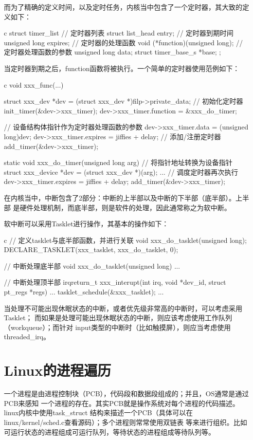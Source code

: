 而为了精确的定义时间，以及定时任务，内核当中包含了一个定时器，其大致的定义如下：
\begin{code-block}{c}
struct timer_list {
        // 定时器列表
        struct list_head entry;
        // 定时器到期时间
        unsigned long expires;
        // 定时器的处理函数
        void (*function)(unsigned long);
        // 定时器处理函数的参数
        unsigned long data;
        struct timer_base_s *base;
};
\end{code-block}
当定时器到期之后，function函数将被执行。一个简单的定时器使用范例如下：
\begin{code-block}{c}
void xxx_func(...)
{
        struct xxx_dev *dev = (struct xxx_dev *)filp->private_data;
        // 初始化定时器
        init_timer(&dev->xxx_timer);
        dev->xxx_timer.function = &xxx_do_timer;

        // 设备结构体指针作为定时器处理函数的参数
        dev->xxx_timer.data = (unsigned long)dev;
        dev->xxx_timer.expires = jiffies + delay;
        //  添加/注册定时器
        add_timer(&dev->xxx_timer);
}

static void xxx_do_timer(unsigned long arg)
{
        // 将指针地址转换为设备指针
        struct xxx_device *dev = (struct xxx_dev *)(arg);
        ...
        // 调度定时器再次执行
        dev->xxx_timer.expires = jiffies + delay;
        add_timer(&dev->xxx_timer);
}
\end{code-block}

在内核当中，中断包含了2部分：中断的上半部以及中断的下半部（底半部）。上半部
是硬件处理机制，而底半部，则是软件的处理，因此通常称之为软中断。

软中断可以采用Tasklet进行操作，其基本的操作如下：
\begin{code-block}{c}
// 定义tasklet与底半部函数，并进行关联
void xxx_do_tasklet(unsigned long);
DECLARE_TASKLET(xxx_tasklet, xxx_do_tasklet, 0);

// 中断处理底半部
void xxx_do_tasklet(unsigned long)
{
        ...
}

// 中断处理顶半部
irqreturn_t xxx_interupt(int irq, void *dev_id, struct pt_regs *regs)
{
        ...
        tasklet_schedule(&xxx_tasklet);
        ...
}
\end{code-block}
当处理不可能出现休眠状态的中断，或者优先级非常高的中断时，可以考虑采用Tasklet；
而如果是处理可能出现休眠状态的中断，则应该考虑使用工作队列（workqueue）；而针对
input类型的中断时（比如触摸屏），则应当考虑使用threaded\_irq。

\section{Linux的进程遍历}
一个进程是由进程控制块（PCB），代码段和数据段组成的；并且，OS通常是通过PCB来感知
一个进程的存在。其实PCB就是操作系统对每个进程的代码描述。linux内核中使用task\_struct
结构来描述一个PCB（具体可以在linux/kernel/sched.c查看源码）；多个进程则常常使用双链表
等来进行组织。比如可运行状态的进程组成可运行队列，等待状态的进程组成等待队列等。

